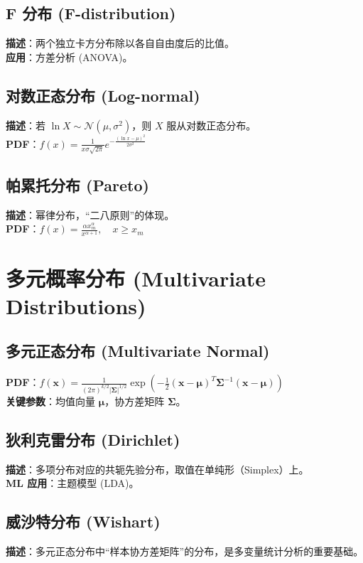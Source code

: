\documentclass[12pt, a4paper]{article}
\begin{document}
\subsection{F 分布 (F-distribution)}
\textbf{描述}：两个独立卡方分布除以各自自由度后的比值。
\\ \textbf{应用}：方差分析 (ANOVA)。

\subsection{对数正态分布 (Log-normal)}
\textbf{描述}：若 $\ln X \sim \mathcal{N}(\mu, \sigma^2)$，则 $X$ 服从对数正态分布。
\\ \textbf{PDF}：$f(x) = \frac{1}{x\sigma\sqrt{2\pi}} e^{-\frac{(\ln x-\mu)^2}{2\sigma^2}}$

\subsection{帕累托分布 (Pareto)}
\textbf{描述}：幂律分布，“二八原则”的体现。
\\ \textbf{PDF}：$f(x) = \frac{\alpha x_m^\alpha}{x^{\alpha+1}}, \quad x \ge x_m$

\section{多元概率分布 (Multivariate Distributions)}

\subsection{多元正态分布 (Multivariate Normal)}
\textbf{PDF}：$f(\mathbf{x}) = \frac{1}{(2\pi)^{k/2}|\boldsymbol{\Sigma}|^{1/2}} \exp\left(-\frac{1}{2}(\mathbf{x}-\boldsymbol{\mu})^T \boldsymbol{\Sigma}^{-1} (\mathbf{x}-\boldsymbol{\mu})\right)$
\\ \textbf{关键参数}：均值向量 $\boldsymbol{\mu}$，协方差矩阵 $\boldsymbol{\Sigma}$。

\subsection{狄利克雷分布 (Dirichlet)}
\textbf{描述}：多项分布对应的共轭先验分布，取值在单纯形（Simplex）上。
\\ \textbf{ML 应用}：主题模型 (LDA)。

\subsection{威沙特分布 (Wishart)}
\textbf{描述}：多元正态分布中“样本协方差矩阵”的分布，是多变量统计分析的重要基础。
\end{document}
